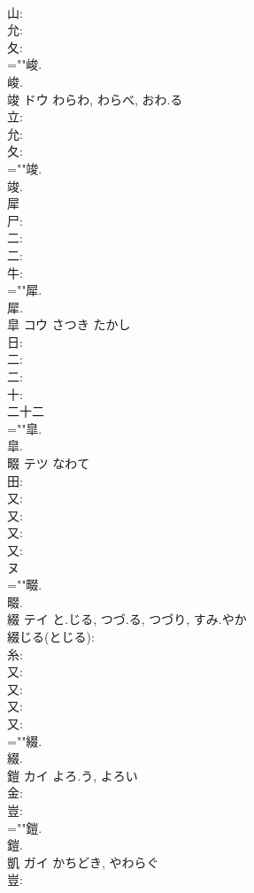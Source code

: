 \documentclass[8pt]{extreport}
\begin{document}
\begin{CJK}{UTF8}{min}
\\	山: 
\\	允: 
\\	夂: 
\\	=""峻.
\\	峻.
\\	竣	ドウ	わらわ, わらべ, おわ.る		
\\	立: 
\\	允: 
\\	夂: 
\\	=""竣.
\\	竣.
\\	犀						
\\	尸: 
\\	二: 
\\	二: 
\\	牛: 
\\	=""犀.
\\	犀.
\\	皐	コウ	さつき	たかし	
\\	日: 
\\	二: 
\\	二: 
\\	十: 
\\	二十二 
\\	=""皐.
\\	皐.
\\	畷	テツ	なわて		
\\	田: 
\\	又: 
\\	又: 
\\	又: 
\\	又: 
\\	ヌ
\\	=""畷.
\\	畷.
\\	綴	テイ	と.じる, つづ.る, つづり, すみ.やか		
\\	綴じる(とじる): 
\\	糸: 
\\	又: 
\\	又: 
\\	又: 
\\	又: 
\\	=""綴.
\\	綴.
\\	鎧	カイ	よろ.う, よろい		
\\	金: 
\\	豈: 
\\	=""鎧.
\\	鎧.
\\	凱	ガイ	かちどき, やわらぐ		
\\	豈: 

\end{CJK}
\end{document}
